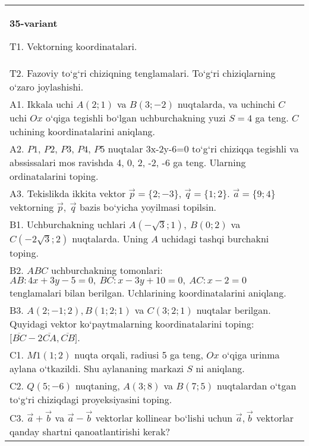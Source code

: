 \documentclass{article}
\begin{document}
\begin{tabular}{m{17cm}}
\textbf{35-variant}
\newline

T1. 
Vektorning koordinatalari.
 \\
T2. 
Fazoviy to‘g‘ri chiziqning tenglamalari. To‘g‘ri chiziqlarning o‘zaro joylashishi.
 \\
A1. 
Ikkala uchi $A (2;1) $ va $B (3;-2) $ nuqtalarda, va
uchinchi $C$ uchi $Ox$ o‘qiga tegishli bo‘lgan uchburchakning
yuzi $S=4$ ga teng. $C$ uchining koordinatalarini aniqlang. \\
A2. 
$P1$, $P2$, $P3$, $P4$, $P5$ nuqtalar
3x-2y-6=0 to‘g‘ri chiziqqa tegishli va abssissalari mos ravishda
4, 0, 2, -2, -6 ga teng. Ularning ordinatalarini toping.
 \\
A3. 
Tekislikda ikkita vektor
$\overrightarrow{p} = \{ 2; - 3\}$, $\overrightarrow{q} = \{ 1;2\}$.
$\overrightarrow{a} = \{9;4\}$ vektorning
$\overrightarrow{p},\ \overrightarrow{q}$ bazis bo‘yicha yoyilmasi topilsin.
 \\
B1. 
Uchburchakning uchlari
\(A\left(-\sqrt{3};1 \right),\ B (0;2) \) va
\(C\left(-2\sqrt{3};2 \right) \) nuqtalarda. Uning $A$
uchidagi tashqi burchakni toping.
 \\
B2. 
$ABC$ uchburchakning tomonlari:
\(AB:4x+3y-5=0,\ BC:x-3y+10=0,\ AC:x-2=0\) 
tenglamalari bilan berilgan. Uchlarining koordinatalarini aniqlang.
 \\
B3. 
$A (2; -1;2),B (1;2; 1) $ va $C (3;2;1) $ nuqtalar berilgan. Quyidagi vektor ko‘paytmalarning koordinatalarini toping:
$\lbrack\overline{BC} - 2\overline{CA},\overline{CB}\rbrack$. \\
C1. 
\(M{1} (1; 2) \) nuqta orqali, radiusi 5 ga teng,
$Ox$ o‘qiga urinma aylana o‘tkazildi. Shu aylananing markazi
$S$ ni aniqlang.
 \\
C2. 
\(Q (5; - 6) \) nuqtaning, \(A (3;8) \) va \(B (7;5) \)
nuqtalardan o‘tgan to‘g‘ri chiziqdagi proyeksiyasini toping.
 \\
C3. 
\(\vec{a}+\vec{b}\) va \(\vec{a} - \vec{b}\) vektorlar kollinear bo‘lishi uchun \(\vec{a},\vec{b}\) vektorlar qanday shartni qanoatlantirishi kerak?
 \\

\end{tabular}
\vspace{1cm}
\end{document}
